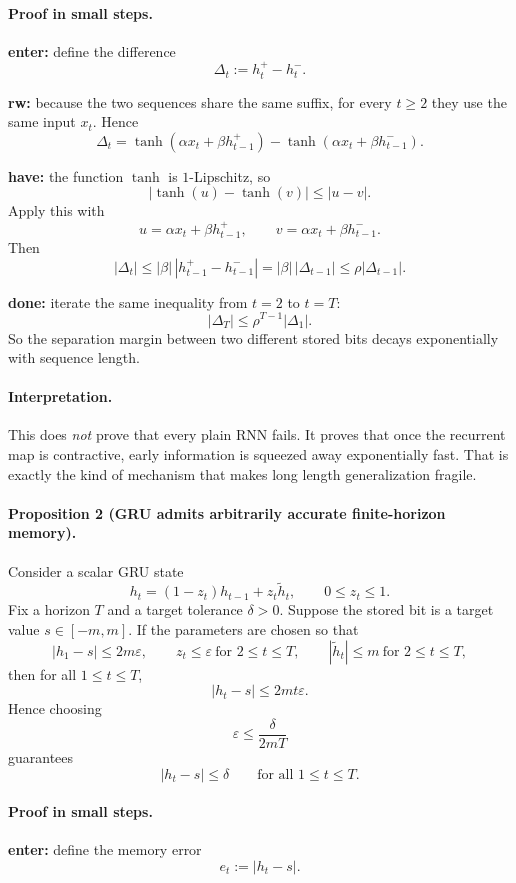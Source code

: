 \documentclass[12pt,a4paper]{article}
\begin{document}
\paragraph{Proof in small steps.}
\textbf{enter:} define the difference
\[
\Delta_t := h_t^+ - h_t^-.
\]

\textbf{rw:} because the two sequences share the same suffix, for every \(t \ge 2\) they use the same input \(x_t\). Hence
\[
\Delta_t
=
\tanh(\alpha x_t + \beta h_{t-1}^+)
-
\tanh(\alpha x_t + \beta h_{t-1}^-).
\]

\textbf{have:} the function \(\tanh\) is \(1\)-Lipschitz, so
\[
|\tanh(u)-\tanh(v)| \le |u-v|.
\]
Apply this with
\[
u=\alpha x_t + \beta h_{t-1}^+,
\qquad
v=\alpha x_t + \beta h_{t-1}^-.
\]
Then
\[
|\Delta_t|
\le
|\beta|\,|h_{t-1}^+ - h_{t-1}^-|
=
|\beta|\,|\Delta_{t-1}|
\le
\rho |\Delta_{t-1}|.
\]

\textbf{done:} iterate the same inequality from \(t=2\) to \(t=T\):
\[
|\Delta_T|
\le
\rho^{T-1}|\Delta_1|.
\]
So the separation margin between two different stored bits decays exponentially with sequence length.

\paragraph{Interpretation.}
This does \emph{not} prove that every plain RNN fails. It proves that once the recurrent map is contractive, early information is squeezed away exponentially fast. That is exactly the kind of mechanism that makes long length generalization fragile.

\paragraph{Proposition 2 (GRU admits arbitrarily accurate finite-horizon memory).}
Consider a scalar GRU state
\[
h_t = (1-z_t)h_{t-1} + z_t \tilde h_t,
\qquad 0 \le z_t \le 1.
\]
Fix a horizon \(T\) and a target tolerance \(\delta > 0\). Suppose the stored bit is a target value \(s \in [-m,m]\). If the parameters are chosen so that
\[
|h_1-s| \le 2m\varepsilon,
\qquad
z_t \le \varepsilon \ \text{for } 2 \le t \le T,
\qquad
|\tilde h_t| \le m \ \text{for } 2 \le t \le T,
\]
then for all \(1 \le t \le T\),
\[
|h_t-s| \le 2mt\varepsilon.
\]
Hence choosing
\[
\varepsilon \le \frac{\delta}{2mT}
\]
guarantees
\[
|h_t-s| \le \delta
\qquad
\text{for all } 1 \le t \le T.
\]

\paragraph{Proof in small steps.}
\textbf{enter:} define the memory error
\[
e_t := |h_t-s|.
\]
\end{document}
